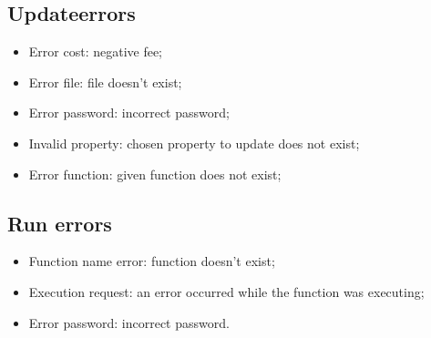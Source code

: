 \subsection{Update\glo errors}
\begin{itemize}
	\item Error cost: negative fee;
	\item Error file: file doesn't exist;
	\item Error password: incorrect password;
	\item Invalid property: chosen property to update does not exist;
	\item Error function: given function does not exist;
\end{itemize}
\subsection{Run errors}
\begin{itemize}
	\item Function name error: function doesn't exist;
	\item Execution request: an error occurred while the function was executing;
	\item Error password: incorrect password.
\end{itemize}
